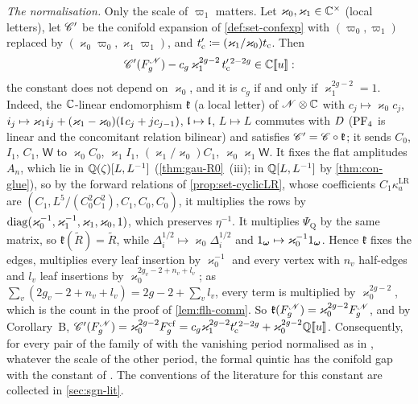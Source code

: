 \begin{rmk}
\emph{The normalisation.} Only the scale of $\varpi_1$ matters. Let $\varkappa_0,\varkappa_1\in\mathbb{C}^\times$ (local letters), let $\mathscr{C}'$ be the conifold expansion of \cref{def:set-confexp} with $(\varpi_0,\varpi_1)$ replaced by $(\varkappa_0\varpi_0,\varkappa_1\varpi_1)$, and $t_{\mathrm{c}}'\coloneqq(\varkappa_1/\varkappa_0)t_{\mathrm{c}}$. Then
\[
\mathscr{C}'(F_g^{\mathscr{N}})-c_g\,\varkappa_1^{2g-2}\,t_{\mathrm{c}}'^{\,2-2g}\in\mathbb{C}[\![ u ]\!]:
\]
the constant does not depend on $\varkappa_0$, and it is $c_g$ if and only if $\varkappa_1^{2g-2}=1$. Indeed, the $\mathbb{C}$-linear endomorphism $\mathfrak k$ (a local letter) of $\mathscr{N}\otimes\mathbb{C}$ with $c_j\mapsto\varkappa_0c_j$, $i_j\mapsto\varkappa_1i_j+(\varkappa_1-\varkappa_0)(\mathfrak{l}\,c_j+jc_{j-1})$, $\mathfrak{l}\mapsto\mathfrak{l}$, $L\mapsto L$ commutes with $D$ ($\mathrm{PF}_{4}$ is linear and the concomitant relation bilinear) and satisfies $\mathscr{C}'=\mathscr{C}\circ\mathfrak k$; it sends $C_0$, $I_1$, $C_1$, $\mathsf W$ to $\varkappa_0C_0$, $\varkappa_1I_1$, $(\varkappa_1/\varkappa_0)C_1$, $\varkappa_0\varkappa_1\mathsf W$. It fixes the flat amplitudes $A_n$, which lie in $\mathbb{Q}(\zeta)[L,L^{-1}]$ (\cref{thm:gau-R0}~(iii); in $\mathbb{Q}[L,L^{-1}]$ by \cref{thm:con-glue}), so by the forward relations of \cref{prop:set-cyclicLR}, whose coefficients $C_1\kappa^{\mathrm{LR}}_a$ are $(C_1,L^5/(C_0^2C_1^2),C_1,C_0,C_0)$, it multiplies the rows by $\operatorname{diag}(\varkappa_0^{-1},\varkappa_1^{-1},\varkappa_1,\varkappa_0,1)$, which preserves $\eta^{-1}$. It multiplies $\Psi_{\mathrm Q}$ by the same matrix, so $\mathfrak k(\tilde R)=\tilde R$, while $\Delta_i^{1/2}\mapsto\varkappa_0\Delta_i^{1/2}$ and $1_{\boldsymbol{\omega}}\mapsto\varkappa_0^{-1}1_{\boldsymbol{\omega}}$. Hence $\mathfrak k$ fixes the edges, multiplies every leaf insertion by $\varkappa_0^{-1}$ and every vertex with $n_v$ half-edges and $l_v$ leaf insertions by $\varkappa_0^{2g_v-2+n_v+l_v}$; as $\sum_v(2g_v-2+n_v+l_v)=2g-2+\sum_vl_v$, every term is multiplied by $\varkappa_0^{2g-2}$, which is the count in the proof of \cref{lem:flh-comm}. So $\mathfrak k(F_g^{\mathscr{N}})=\varkappa_0^{2g-2}F_g^{\mathscr{N}}$, and by Corollary~B, $\mathscr{C}'(F_g^{\mathscr{N}})=\varkappa_0^{2g-2}F_g^{\mathrm{cf}}=c_g\varkappa_1^{2g-2}t_{\mathrm{c}}'^{\,2-2g}+\varkappa_0^{2g-2}\mathbb{Q}[\![ u ]\!]$. Consequently, for every pair of the family of \cite[Rem.~1.4]{CGYZ26} with the vanishing period normalised as in \cite[Prop.-Def.~4.5\,(1)]{CGYZ26}, whatever the scale of the other period, the formal quintic has the conifold gap with the constant of \cite[Conj.~1.5]{CGYZ26}. The conventions of the literature for this constant are collected in \cref{sec:sgn-lit}.


\end{rmk}
